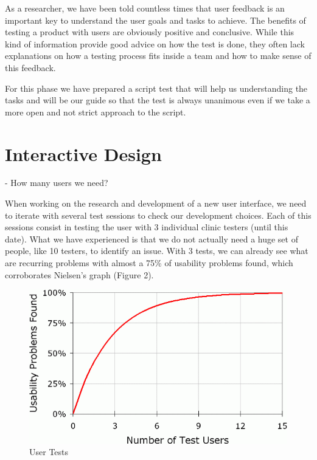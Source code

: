 As a researcher, we have been told countless times that user feedback is an important key to understand the user goals and tasks to achieve. The benefits of testing a product with users are obviously positive and conclusive. While this kind of information provide good advice on how the test is done, they often lack explanations on how a testing process fits inside a team and how to make sense of this feedback.

For this phase we have prepared a script test that will help us understanding the tasks and will be our guide so that the test is always unanimous even if we take a more open and not strict approach to the script.

\clearpage

\section{Interactive Design}

- How many users we need?

When working on the research and development of a new user interface, we need to iterate with several test sessions to check our development choices. Each of this sessions consist in testing the user with 3 individual clinic testers (until this date). What we have experienced is that we do not actually need a huge set of people, like 10 testers, to identify an issue. With 3 tests, we can already see what are recurring problems with almost a 75\% of usability problems found, which corroborates Nielsen’s graph \cite{needTest} (Figure 2).

\begin{figure}[!hbt]
\centering
\includegraphics[width=1.0\textwidth]{number-of-test-users.png}
\caption{\label{fig:frog}User Tests}
\end{figure}

